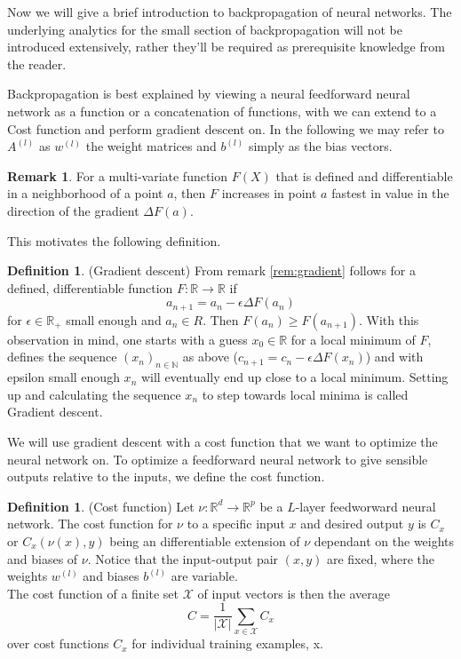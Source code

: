\documentclass{article}
\theoremstyle{definition}
\newtheorem{definition}[theorem]{Definition}
\newtheorem{remark}[theorem]{Remark}
\begin{document}
Now we will give a brief introduction to backpropagation of neural networks. The underlying analytics for the small section of backpropagation will not be introduced extensively, rather they'll be required as prerequisite knowledge from the reader.

Backpropagation is best explained by viewing a neural feedforward neural network as a function or a concatenation of functions, with we can extend to a Cost function and perform gradient descent on.
In the following we may refer to $A^{(l)}$ as $w^{(l)}$ the weight matrices and $b^{(l)}$ simply as the bias vectors.

\begin{remark}
For a multi-variate function $F(X)$ that is defined and differentiable in a neighborhood of a point $a$, then $F$ increases in point $a$ fastest in value in the direction of the gradient $\Delta F(a)$.
\end{remark}\label{rem:gradient}
This motivates the following definition.

\begin{definition}(Gradient descent)
From remark \ref{rem:gradient} follows for a defined, differentiable function $F: \mathbb{R} \to \mathbb{R}$ if 
$$a_{n+1}=a_{n}-\epsilon \Delta F(a_{n})$$
for $\epsilon \in \mathbb{R}_{+}$ small enough and $a_{n} \in R$. Then $F(a_{n}) \geq F(a_{n+1})$. With this observation in mind, one starts with a guess $x_{0} \in \mathbb{R}$ for a local minimum of $F$, defines the sequence $(x_{n})_{n\in\mathbb{N}}$ as above ($c_{n+1}=c_{n}-\epsilon \Delta F(x_{n})$) and with epsilon small enough $x_{n}$ will eventually end up close to a local minimum. Setting up and calculating the sequence $x_{n}$ to step towards local minima is called Gradient descent.
\end{definition}

We will use gradient descent with a cost function that we want to optimize the neural network on. To optimize a feedforward neural network to give sensible outputs relative to the inputs, we define the cost function.

\begin{definition}(Cost function)
\label{def:cost_fct}
Let $\nu : \mathbb{R}^{d} \to \mathbb{R}^{p}$ be a $L$-layer feedworward neural network. The cost function for $\nu$ to a specific input $x$ and desired output $y$ is $C_{x}$ or $C_{x}(\nu(x), y)$ being an differentiable extension of $\nu$ dependant on the weights and biases of $\nu$. Notice that the input-output pair $(x, y)$ are fixed, where the weights $w^{(l)}$ and biases $b^{(l)}$ are variable. \\
The cost function of a finite set $\mathcal{X}$ of input vectors is then the average $$C=\frac{1}{|\mathcal{X}|}\sum_{x \in \mathcal{X}}C_{x}$$
over cost functions $C_{x}$ for individual training examples, x.
\end{definition}
\end{document}
